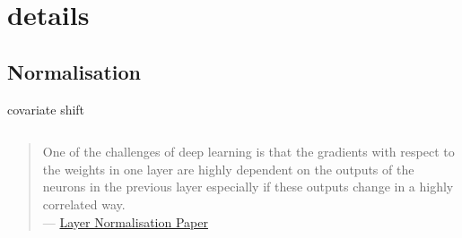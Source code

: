 \documentclass[aspectratio=169,xcolor={dvipsnames,svgnames}]{beamer}
\begin{document}
\section{details}
\label{sec:appendix}
\subsection{Normalisation}
\label{sec:org5875b4e}

\begin{frame}[label={sec:covariate-shift}]{covariate shift}
\begin{columns}
\begin{column}{0.45\columnwidth}
\begin{quote}
One of the challenges of deep learning is that the
gradients with respect to the weights in one layer are
highly dependent on the outputs of the neurons in the
previous layer especially if these outputs change in a
highly correlated way. \\[0pt]
--- \href{http://arxiv.org/abs/1607.06450}{Layer Normalisation Paper}
\end{quote}
\end{column}
\end{columns}
\end{frame}
\end{document}
